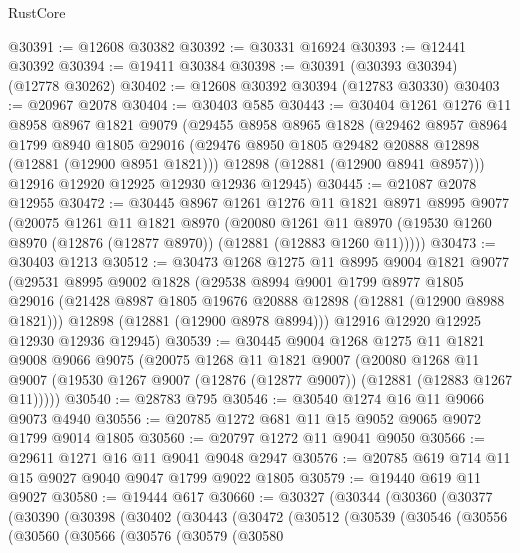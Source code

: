 \begin{lexlean}{RustCore}
\begin{coremodule}
@30391 := @12608 @30382
@30392 := @30331 @16924
@30393 := @12441 @30392
@30394 := @19411 @30384
@30398 := @30391 (@30393 @30394) (@12778 @30262)
@30402 := @12608 @30392 @30394 (@12783 @30330)
@30403 := @20967 @2078
@30404 := @30403 @585
@30443 := @30404
    @1261
    @1276
    @11
    @8958
    @8967
    @1821
    @9079
    (@29455
      @8958
      @8965
      @1828
      (@29462
        @8957
        @8964
        @1799
        @8940
        @1805
        @29016
        (@29476 @8950 @1805 @29482 @20888 @12898 (@12881 (@12900 @8951 @1821)))
        @12898
        (@12881 (@12900 @8941 @8957)))
      @12916
      @12920
      @12925
      @12930
      @12936
      @12945)
@30445 := @21087 @2078 @12955
@30472 := @30445
    @8967
    @1261
    @1276
    @11
    @1821
    @8971
    @8995
    @9077
    (@20075
      @1261
      @11
      @1821
      @8970
      (@20080
        @1261
        @11
        @8970
        (@19530 @1260 @8970 (@12876 (@12877 @8970)) (@12881 (@12883 @1260 @11)))))
@30473 := @30403 @1213
@30512 := @30473
    @1268
    @1275
    @11
    @8995
    @9004
    @1821
    @9077
    (@29531
      @8995
      @9002
      @1828
      (@29538
        @8994
        @9001
        @1799
        @8977
        @1805
        @29016
        (@21428 @8987 @1805 @19676 @20888 @12898 (@12881 (@12900 @8988 @1821)))
        @12898
        (@12881 (@12900 @8978 @8994)))
      @12916
      @12920
      @12925
      @12930
      @12936
      @12945)
@30539 := @30445
    @9004
    @1268
    @1275
    @11
    @1821
    @9008
    @9066
    @9075
    (@20075
      @1268
      @11
      @1821
      @9007
      (@20080
        @1268
        @11
        @9007
        (@19530 @1267 @9007 (@12876 (@12877 @9007)) (@12881 (@12883 @1267 @11)))))
@30540 := @28783 @795
@30546 := @30540 @1274 @16 @11 @9066 @9073 @4940
@30556 := @20785 @1272 @681 @11 @15 @9052 @9065 @9072 @1799 @9014 @1805
@30560 := @20797 @1272 @11 @9041 @9050
@30566 := @29611 @1271 @16 @11 @9041 @9048 @2947
@30576 := @20785 @619 @714 @11 @15 @9027 @9040 @9047 @1799 @9022 @1805
@30579 := @19440 @619 @11 @9027
@30580 := @19444 @617
@30660 := @30327
    (@30344
      (@30360
        (@30377
          (@30390
            (@30398
              (@30402
                (@30443
                  (@30472
                    (@30512
                      (@30539
                        (@30546
                          (@30556
                            (@30560
                              (@30566
                                (@30576
                                  (@30579
                                    (@30580

\end{coremodule}
\end{lexlean}

